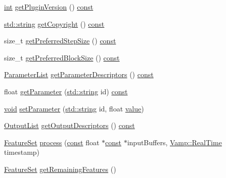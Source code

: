 \begin{DoxyCompactItemize}
\hyperlink{xmltok_8h_a5a0d4a5641ce434f1d23533f2b2e6653}{int} \hyperlink{class_fixed_tempo_estimator_ad002fddb3735c2dd7e31e6a9def9949f}{get\+Plugin\+Version} () \hyperlink{getopt1_8c_a2c212835823e3c54a8ab6d95c652660e}{const} 
\item 
\hyperlink{test__lib_f_l_a_c_2format_8c_ab02026ad0de9fb6c1b4233deb0a00c75}{std\+::string} \hyperlink{class_fixed_tempo_estimator_a50c6b64530c84c0707ba3936c5022a48}{get\+Copyright} () \hyperlink{getopt1_8c_a2c212835823e3c54a8ab6d95c652660e}{const} 
\item 
size\+\_\+t \hyperlink{class_fixed_tempo_estimator_ad450bb7e7df559ae3d68dfbfb085676f}{get\+Preferred\+Step\+Size} () \hyperlink{getopt1_8c_a2c212835823e3c54a8ab6d95c652660e}{const} 
\item 
size\+\_\+t \hyperlink{class_fixed_tempo_estimator_a68b8569b71504a0478caf990dbe30683}{get\+Preferred\+Block\+Size} () \hyperlink{getopt1_8c_a2c212835823e3c54a8ab6d95c652660e}{const} 
\item 
\hyperlink{class_vamp_1_1_plugin_base_a3b6bb4bbd86affe1ca9deceea1aad4f8}{Parameter\+List} \hyperlink{class_fixed_tempo_estimator_ae157465a4e07d180bab05b5c3a4d8987}{get\+Parameter\+Descriptors} () \hyperlink{getopt1_8c_a2c212835823e3c54a8ab6d95c652660e}{const} 
\item 
float \hyperlink{class_fixed_tempo_estimator_a2030b05fb1228b30ace16200780c9152}{get\+Parameter} (\hyperlink{test__lib_f_l_a_c_2format_8c_ab02026ad0de9fb6c1b4233deb0a00c75}{std\+::string} id) \hyperlink{getopt1_8c_a2c212835823e3c54a8ab6d95c652660e}{const} 
\item 
\hyperlink{sound_8c_ae35f5844602719cf66324f4de2a658b3}{void} \hyperlink{class_fixed_tempo_estimator_a8a5a413025384cf451c64d2c2ce13a75}{set\+Parameter} (\hyperlink{test__lib_f_l_a_c_2format_8c_ab02026ad0de9fb6c1b4233deb0a00c75}{std\+::string} id, float \hyperlink{lib_2expat_8h_a4a30a13b813682e68c5b689b45c65971}{value})
\item 
\hyperlink{class_vamp_1_1_plugin_a30f531b8fb69fac41a24e3d2a6a08ed9}{Output\+List} \hyperlink{class_fixed_tempo_estimator_a83121c205a723fe6297e2bf8870622a4}{get\+Output\+Descriptors} () \hyperlink{getopt1_8c_a2c212835823e3c54a8ab6d95c652660e}{const} 
\item 
\hyperlink{class_vamp_1_1_plugin_a448fb57dc245d47923ec9eeaf9856c5f}{Feature\+Set} \hyperlink{class_fixed_tempo_estimator_a1cf76b0e55cf4ed3da095cffcdeaec3c}{process} (\hyperlink{getopt1_8c_a2c212835823e3c54a8ab6d95c652660e}{const} float $\ast$\hyperlink{getopt1_8c_a2c212835823e3c54a8ab6d95c652660e}{const} $\ast$input\+Buffers, \hyperlink{struct_vamp_1_1_real_time}{Vamp\+::\+Real\+Time} timestamp)
\item 
\hyperlink{class_vamp_1_1_plugin_a448fb57dc245d47923ec9eeaf9856c5f}{Feature\+Set} \hyperlink{class_fixed_tempo_estimator_a4965cf99be77fc4d1de51e11d83936b0}{get\+Remaining\+Features} ()
\end{DoxyCompactItemize}
